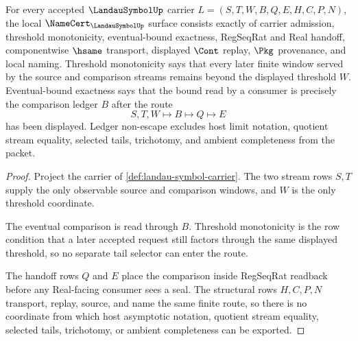 \begin{theorem}
\label{thm:landau-symbol-namecert-obligations}
For every accepted $\LandauSymbolUp$ carrier $L=(S,T,W,B,Q,E,H,C,P,N)$, the local $\NameCert_{\LandauSymbolUp}$ surface consists exactly of carrier admission, threshold monotonicity, eventual-bound exactness, RegSeqRat and Real handoff, componentwise $\hsame$ transport, displayed $\Cont$ replay, $\Pkg$ provenance, and local naming. Threshold monotonicity says that every later finite window served by the source and comparison streams remains beyond the displayed threshold $W$. Eventual-bound exactness says that the bound read by a consumer is precisely the comparison ledger $B$ after the route
$$
S,T,W \longmapsto B \longmapsto Q \longmapsto E
$$
has been displayed. Ledger non-escape excludes host limit notation, quotient stream equality, selected tails, trichotomy, and ambient completeness from the packet.
\end{theorem}
\begin{proof}
Project the carrier of \autoref{def:landau-symbol-carrier}. The two stream rows $S,T$ supply the only observable source and comparison windows, and $W$ is the only threshold coordinate.

The eventual comparison is read through $B$. Threshold monotonicity is the row condition that a later accepted request still factors through the same displayed threshold, so no separate tail selector can enter the route.

The handoff rows $Q$ and $E$ place the comparison inside RegSeqRat readback before any Real-facing consumer sees a seal. The structural rows $H,C,P,N$ transport, replay, source, and name the same finite route, so there is no coordinate from which host asymptotic notation, quotient stream equality, selected tails, trichotomy, or ambient completeness can be exported.
\end{proof}



